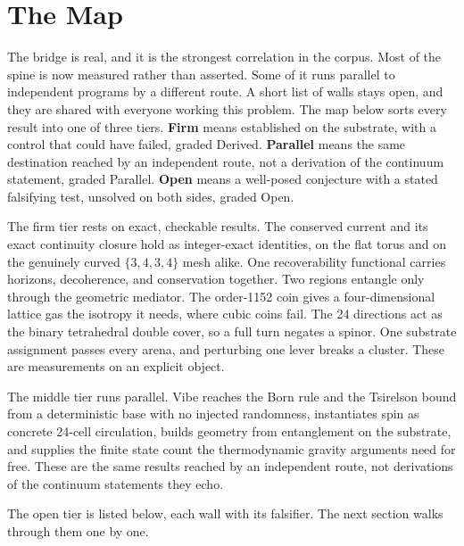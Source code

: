 \section{The Map}

The bridge is real, and it is the strongest correlation in the corpus. Most of the spine is now
measured rather than asserted. Some of it runs parallel to independent programs by a different route. A short list of walls
stays open, and they are shared with everyone working this problem. The map below sorts every result into one of three
tiers. \textbf{Firm} means established on the substrate, with a control that could have failed, graded Derived. \textbf{Parallel}
means the same destination reached by an independent route, not a derivation of the continuum statement, graded Parallel.
\textbf{Open} means a well-posed conjecture with a stated falsifying test, unsolved on both sides, graded Open.

The firm tier rests on exact, checkable results. The conserved current and its exact continuity closure hold as integer-exact identities,
on the flat torus and on the genuinely curved $\{3,4,3,4\}$ mesh alike. One recoverability functional carries horizons,
decoherence, and conservation together. Two regions entangle only through the geometric mediator. The order-1152 coin
gives a four-dimensional lattice gas the isotropy it needs, where cubic coins fail. The 24 directions act as the binary
tetrahedral double cover, so a full turn negates a spinor. One substrate assignment passes every arena, and perturbing one
lever breaks a cluster. These are measurements on an explicit object.

The middle tier runs parallel. Vibe reaches the Born rule and the Tsirelson bound from a deterministic base with no
injected randomness, instantiates spin as concrete 24-cell circulation, builds geometry from entanglement on the
substrate, and supplies the finite state count the thermodynamic gravity arguments need for free. These are the same results
reached by an independent route, not derivations of the continuum statements they echo.

The open tier is listed below, each wall with its falsifier. The next section walks through them one by one.


